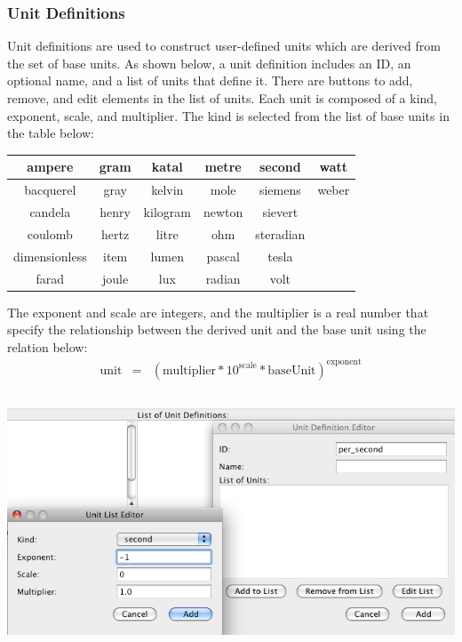 \documentclass[titlepage,11pt]{article}
\begin{document}
\subsubsection{\label{unitDefn}Unit Definitions}

\noindent
Unit definitions are used to construct user-defined units which are 
derived from the set of base units.  As shown below, a 
unit definition includes an ID, 
an optional name, and a list of units that define it.  There are
buttons to add, remove, and edit elements in the list of units.  
Each unit is composed of a kind, exponent, scale, and multiplier.  The kind 
is selected from the list of base units in the table below:

\begin{center}
\begin{tabular}{|c|c|c|c|c|c|}
\hline
ampere        & gram  & katal    & metre  & second    & watt \\ \hline
bacquerel     & gray  & kelvin   & mole   & siemens   & weber \\ \hline
candela       & henry & kilogram & newton & sievert   & ~\\ \hline
coulomb       & hertz & litre    & ohm    & steradian & ~\\ \hline
dimensionless & item  & lumen    & pascal & tesla     & ~\\ \hline
farad         & joule & lux      & radian & volt      & ~\\ \hline
\end{tabular}
\end{center}

The exponent and scale are integers, and the multiplier is a real
number that specify the relationship between the derived unit and the
base unit using the relation below:
\begin{eqnarray*}
\mathrm{unit} & = & (\mathrm{multiplier} * 10^\mathrm{scale} * \mathrm{baseUnit})^\mathrm{exponent}
\end{eqnarray*}
\begin{center}
\includegraphics[height=75mm]{screenshots/units}
\end{center}
\end{document}
